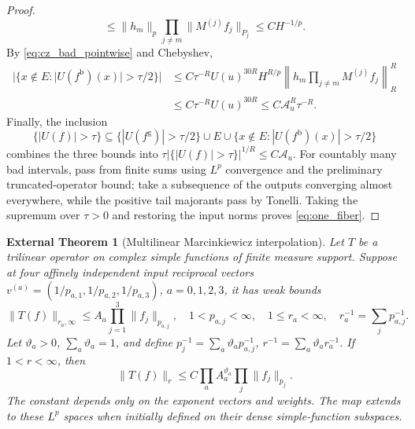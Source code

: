 \documentclass[12pt,reqno]{amsart}
\theoremstyle{plain}
\newtheorem{exttheorem}[theorem]{External Theorem}
\theoremstyle{definition}
\theoremstyle{remark}
\numberwithin{equation}{section}
\begin{document}
\begin{proof}
\[ \le\|h_m\|_p\prod_{j\ne m}\|M^{(j)}f_j\|_{P_j}
 \le C H^{-1/p}.
\]
By \eqref{eq:cz_bad_pointwise} and Chebyshev,
\begin{align*}
 |\{x\notin E:|U(f^{\mathrm b})(x)|>\tau/2\}|
 &\le C\tau^{-R}U(u)^{30R}H^{R/p}
             \left\|h_m\prod_{j\ne m}M^{(j)}f_j\right\|_R^R\\
 &\le C\tau^{-R}U(u)^{30R}
 \le C\mathcal A_u^R\tau^{-R}.
\end{align*}
Finally, the inclusion
\[
 \{|U(f)|>\tau\}\subseteq
 \{|U(f^{\mathrm g})|>\tau/2\}\cup E\cup
 \{x\notin E:|U(f^{\mathrm b})(x)|>\tau/2\}
\]
combines the three bounds into
$\tau|\{|U(f)|>\tau\}|^{1/R}\le C\mathcal A_u$.
For countably many bad intervals, pass from finite sums using
$L^p$ convergence and the preliminary truncated-operator bound;
take a subsequence of the outputs converging almost everywhere, while
the positive tail majorants pass by Tonelli. Taking the supremum over
$\tau>0$ and restoring the input norms proves \eqref{eq:one_fiber}.
\end{proof}

\begin{exttheorem}[Multilinear Marcinkiewicz interpolation]
\label{ext:interpolation}
Let $T$ be a trilinear operator on complex simple functions of finite
measure support. Suppose
at four affinely independent input reciprocal vectors
$v^{(a)}=(1/p_{a,1},1/p_{a,2},1/p_{a,3})$, $a=0,1,2,3$,
it has weak bounds
\[
 \|T(f)\|_{r_a,\infty}\le A_a\prod_{j=1}^3\|f_j\|_{p_{a,j}},
 \quad 1<p_{a,j}<\infty,\quad1\le r_a<\infty,\quad
 r_a^{-1}=\sum_jp_{a,j}^{-1}.
\]
Let $\vartheta_a>0$, $\sum_a\vartheta_a=1$, and define
$p_j^{-1}=\sum_a\vartheta_ap_{a,j}^{-1}$,
$r^{-1}=\sum_a\vartheta_ar_a^{-1}$. If $1<r<\infty$, then
\[
 \|T(f)\|_r\le C\prod_aA_a^{\vartheta_a}\prod_j\|f_j\|_{p_j}.
\]
The constant depends only on the exponent vectors and weights.
The map extends to these $L^p$ spaces when initially defined on
their dense simple-function subspaces.
\end{exttheorem}
\end{document}
